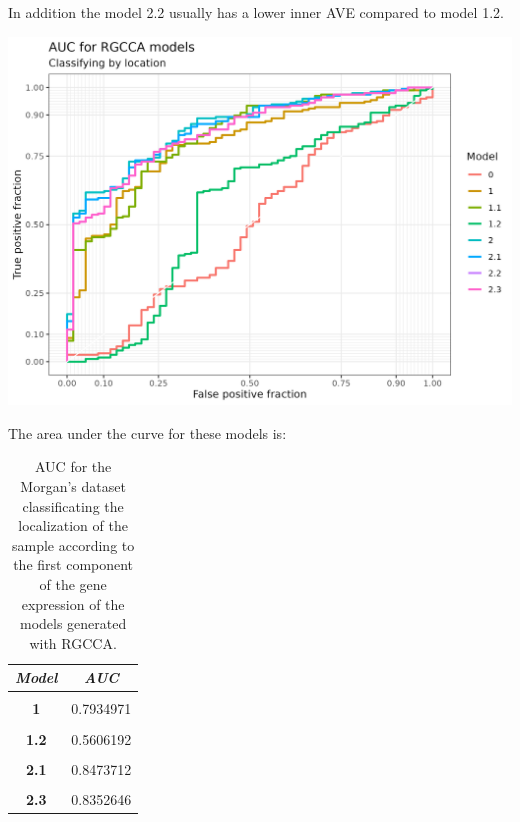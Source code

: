 \documentclass[
  12pt,
  a4paper,
  twoside,
  openright]{book}
\let\origfigure\figure
\let\endorigfigure\endfigure
\renewenvironment{figure}[1][2] {
    \expandafter\origfigure\expandafter[!htp]
} {
    \endorigfigure
}
\begin{document}
In addition the model 2.2 usually has a lower inner AVE compared to model 1.2.

\begin{figure}
\includegraphics[width=1\linewidth]{images/morgan-auc} \caption[AUC plot for the Morgan's dataset]{AUC for the Morgan's dataset classificating the localization of the sample according to the first component of the gene expression of the models generated with RGCCA.}\label{fig:morgan-auc-plot}
\end{figure}

The area under the curve for these models is:

\begin{table}[H]

\caption[AUC for the Morgan's dataset]{\label{tab:morgan-auc}AUC for the Morgan's dataset classificating the localization of the sample according to the first component of the gene expression of the models generated with RGCCA.}
\centering
\begin{tabular}[t]{|>{}c|>{}c|}
\hline
\em{\textbf{Model}} & \em{\textbf{AUC}}\\
\hline
\textbf{\cellcolor{gray!6}{0}} & \cellcolor{gray!6}{0.4969734}\\
\hline
\textbf{1} & 0.7934971\\
\hline
\textbf{\cellcolor{gray!6}{1.1}} & \cellcolor{gray!6}{0.8161536}\\
\hline
\textbf{1.2} & 0.5606192\\
\hline
\textbf{\cellcolor{gray!6}{2}} & \cellcolor{gray!6}{0.8546351}\\
\hline
\textbf{2.1} & 0.8473712\\
\hline
\textbf{\cellcolor{gray!6}{2.2}} & \cellcolor{gray!6}{0.8352646}\\
\hline
\textbf{2.3} & 0.8352646\\
\hline
\end{tabular}
\end{table}
\end{document}

